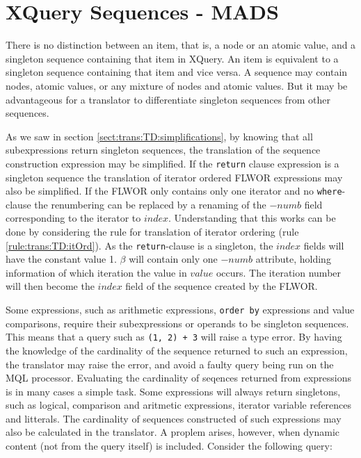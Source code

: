 \section{XQuery Sequences - {MADS}}
\label{sect:disc:singelton}

There is no distinction between an item, that is, a node or an atomic value, and a singleton sequence containing
that item in XQuery. An item is equivalent to a singleton sequence containing that item and vice versa. A sequence
may contain nodes, atomic values, or any mixture of nodes and atomic values. But it may be advantageous for a
translator to differentiate singleton sequences from other sequences. 

As we saw in section \ref{sect:trans:TD:simplifications}, by knowing that all subexpressions return singleton
sequences, the translation of the sequence construction expression may be simplified. If the \texttt{return}
clause expression is a singleton sequence the translation of iterator ordered FLWOR expressions may also be
simplified. If the FLWOR only contains only one iterator and no \texttt{where}-clause the renumbering can be
replaced by a renaming of the $-numb$ field corresponding to the iterator to $index$. Understanding that this
works can be done by considering the rule for translation of iterator ordering (rule \ref{rule:trans:TD:itOrd}).
As the \texttt{return}-clause is a singleton, the $index$ fields will have the constant value 1. $\beta$ will
contain only one $-numb$ attribute, holding information of which iteration the value in $value$ occurs. The
iteration number will then become the $index$ field of the sequence created by the FLWOR.

Some expressions, such as arithmetic expressions, \texttt{order by} expressions and value comparisons, require
their subexpressions or operands to be singleton sequences. This means that a query such as \texttt{(1, 2) + 3}
will raise a type error. By having the knowledge of the cardinality of the sequence returned to such an
expression, the translator may raise the error, and avoid a faulty query being run on the MQL processor.
Evaluating the cardinality of seqences returned from expressions is in many cases a simple task. Some expressions
will always return singletons, such as logical, comparison and aritmetic expressions, iterator variable references
and litterals. The cardinality of sequences constructed of such expressions may also be calculated in the
translator. A proplem arises, however, when dynamic content (not from the query itself) is included. Consider the
following query:

